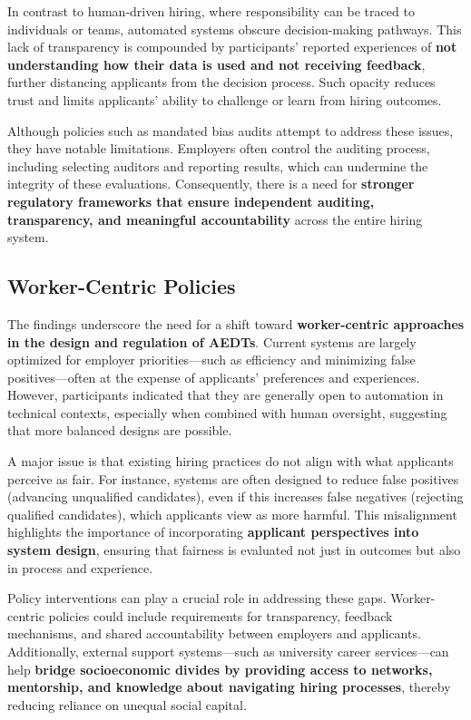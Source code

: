 In contrast to human-driven hiring, where responsibility can be traced to individuals or teams, automated systems obscure decision-making pathways. This lack of transparency is compounded by participants’ reported experiences of \textbf{not understanding how their data is used and not receiving feedback}, further distancing applicants from the decision process. Such opacity reduces trust and limits applicants’ ability to challenge or learn from hiring outcomes.

Although policies such as mandated bias audits attempt to address these issues, they have notable limitations. Employers often control the auditing process, including selecting auditors and reporting results, which can undermine the integrity of these evaluations. Consequently, there is a need for \textbf{stronger regulatory frameworks that ensure independent auditing, transparency, and meaningful accountability} across the entire hiring system.

\subsection{Worker-Centric Policies}
The findings underscore the need for a shift toward \textbf{worker-centric approaches in the design and regulation of AEDTs}. Current systems are largely optimized for employer priorities—such as efficiency and minimizing false positives—often at the expense of applicants’ preferences and experiences. However, participants indicated that they are generally open to automation in technical contexts, especially when combined with human oversight, suggesting that more balanced designs are possible.

A major issue is that existing hiring practices do not align with what applicants perceive as fair. For instance, systems are often designed to reduce false positives (advancing unqualified candidates), even if this increases false negatives (rejecting qualified candidates), which applicants view as more harmful. This misalignment highlights the importance of incorporating \textbf{applicant perspectives into system design}, ensuring that fairness is evaluated not just in outcomes but also in process and experience.

Policy interventions can play a crucial role in addressing these gaps. Worker-centric policies could include requirements for transparency, feedback mechanisms, and shared accountability between employers and applicants. Additionally, external support systems—such as university career services—can help \textbf{bridge socioeconomic divides by providing access to networks, mentorship, and knowledge about navigating hiring processes}, thereby reducing reliance on unequal social capital.

